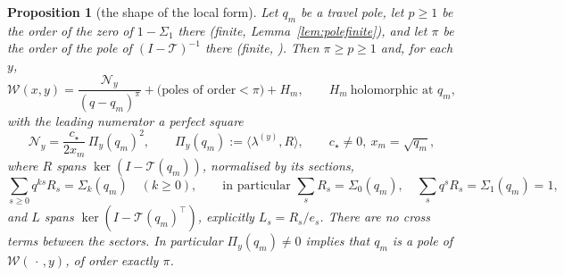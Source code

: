 \documentclass[11pt]{article}
\theoremstyle{plain}
\newtheorem{proposition}[theorem]{Proposition}
\theoremstyle{definition}
\theoremstyle{remark}
\theoremstyle{plain}\newtheorem*{maintheorem}{Main Theorem}
\begin{document}
\begin{proposition}[the shape of the local form]\label{prop:shape}
Let $q_m$ be a travel pole, let $p\ge1$ be the order of the zero of $1-\Sigma_1$ there
\textup{(}finite, Lemma~\ref{lem:polefinite}\textup{)}, and let $\pi$ be the order of the pole of
$(I-\mathcal T)^{-1}$ there \textup{(}finite, {\cite[Lemma ``compactness and meromorphy'', \textup{lem:fred}]{Bonfioli2026bB}}\textup{)}. Then $\pi\ge p\ge1$
and, for each $y$,
\[
   \mathcal W(x,y)=\frac{\mathcal N_y}{(q-q_m)^{\pi}}+\bigl(\text{poles of order}<\pi\bigr)+H_m ,
   \qquad H_m\ \text{holomorphic at }q_m,
\]
with the leading numerator a perfect square
\begin{equation}\label{eq:junctionpairing}
   \mathcal N_y=\frac{c_\star}{2x_m}\,\Pi_y(q_m)^2,\qquad
   \Pi_y(q_m):=\langle\lambda^{(y)},R\rangle ,\qquad c_\star\ne0,\ x_m=\sqrt{q_m},
\end{equation}
where $R$ spans $\ker(I-\mathcal T(q_m))$, normalised by its sections,
\[
   \sum_{s\ge0}q^{ks}R_s=\Sigma_k(q_m)\quad(k\ge0),\qquad\text{in particular }
   \sum_sR_s=\Sigma_0(q_m),\quad\sum_sq^sR_s=\Sigma_1(q_m)=1 ,
\]
and $L$ spans $\ker(I-\mathcal T(q_m)^{\!\top})$, explicitly $L_s=R_s/e_s$. There are no cross
terms between the sectors. In particular $\Pi_y(q_m)\ne0$ implies that $q_m$ is a pole of $\mathcal W(\,\cdot\,,y)$, of order exactly
$\pi$.
\end{proposition}
\end{document}
